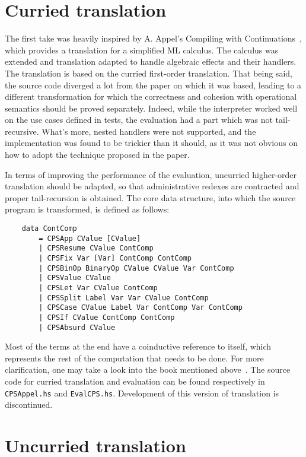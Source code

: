 \documentclass[declaration,shortabstract]{iithesis}
\theoremstyle{definition} \newtheorem{definition}{Definition}[chapter]
\theoremstyle{remark} \newtheorem{remark}[definition]{Observation}
\theoremstyle{plain} \newtheorem{theorem}[definition]{Theorem}
\theoremstyle{plain} \newtheorem{lemma}[definition]{Lemma}
\begin{document}
    \section{Curried translation}

    The first take was heavily inspired by A. Appel's Compiling with
    Continuations~\cite{appel-continuations}, which provides a translation for
    a simplified ML calculus. The calculus was extended and translation adapted to
    handle algebraic effects and their handlers. The translation is based on the curried
    first-order translation. That being said, the source code diverged a lot from the
    paper on which it was based, leading to a different transformation for which the
    correctness and cohesion with operational semantics should be proved separately.
    Indeed, while the interpreter worked well on the use cases defined in tests, the
    evaluation had a part which was not tail-recursive. What's more, nested handlers
    were not supported, and the implementation was found to be trickier than it should,
    as it was not obvious on how to adopt the technique proposed in the paper.

    In terms of improving the performance of the evaluation, uncurried higher-order
    translation should be adapted, so that administrative redexes are contracted
    and proper tail-recursion is obtained. The core data structure, into which the
    source program is transformed, is defined as follows:

\begin{verbatim}
    data ContComp
        = CPSApp CValue [CValue]
        | CPSResume CValue ContComp
        | CPSFix Var [Var] ContComp ContComp
        | CPSBinOp BinaryOp CValue CValue Var ContComp
        | CPSValue CValue
        | CPSLet Var CValue ContComp
        | CPSSplit Label Var Var CValue ContComp
        | CPSCase CValue Label Var ContComp Var ContComp
        | CPSIf CValue ContComp ContComp
        | CPSAbsurd CValue
\end{verbatim}
    Most of the terms at the end have a coinductive reference to itself, which
    represents the rest of the computation that needs to be done. For more
    clarification, one may take a look into the book mentioned
    above~\cite{appel-continuations}. The source code for curried translation and
    evaluation can be found respectively in \verb!CPSAppel.hs! and
    \verb!EvalCPS.hs!. Development of this version of translation is discontinued.

    \section{Uncurried translation}
\end{document}
